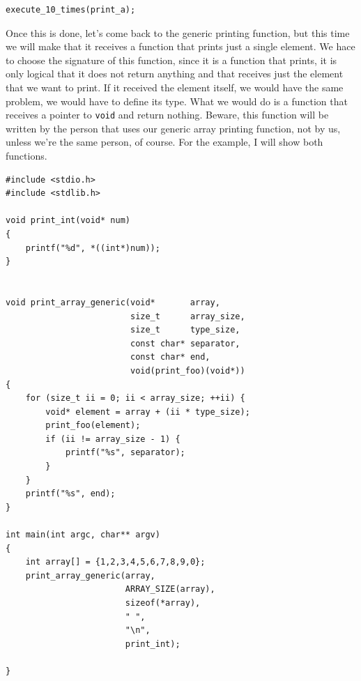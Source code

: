 \documentclass[a4paper]{article}
\begin{document}
\noindent
\begin{minipage}[H]{\linewidth}
\begin{lstlisting}[style=C, label={lst:foocall},
caption={Call to a function that receives a function pointer}]
execute_10_times(print_a);
\end{lstlisting}
\end{minipage}

Once this is done, let's come back to the generic printing function, but this
time we will make that it receives a function that prints just a single element.
We hace to choose the signature of this function, since it is a function that
prints, it is only logical that it does not return anything and that receives
just the element that we want to print. If it received the element itself,
we would have the same problem, we would have to define its type. What we would
do is a function that receives a pointer to \verb!void! and return nothing.
Beware, this function will be written by the person that uses our generic array
printing function, not by us, unless we're the same person, of course. For the
example, I will show both functions.

\noindent
\begin{minipage}[H]{\linewidth}
\mbox{}
\begin{lstlisting}[style=C,
caption={Definición de función de impresión genérica},
label={lst:printArrayGeneric2}]
#include <stdio.h>
#include <stdlib.h>

void print_int(void* num)
{
    printf("%d", *((int*)num));
}


void print_array_generic(void*       array,
                         size_t      array_size,
                         size_t      type_size,
                         const char* separator,
                         const char* end,
                         void(print_foo)(void*))
{
    for (size_t ii = 0; ii < array_size; ++ii) {
        void* element = array + (ii * type_size);
        print_foo(element);
        if (ii != array_size - 1) {
            printf("%s", separator);
        }
    }
    printf("%s", end);
}

int main(int argc, char** argv)
{
    int array[] = {1,2,3,4,5,6,7,8,9,0};
    print_array_generic(array,
                        ARRAY_SIZE(array),
                        sizeof(*array),
                        " ",
                        "\n",
                        print_int);

}
\end{lstlisting}
\end{minipage}
\end{document}

